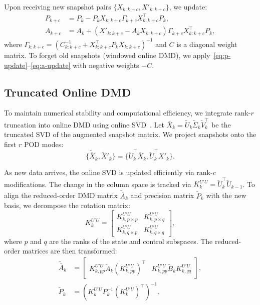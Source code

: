 \documentclass[conference]{IEEEtran}
\begin{document}
Upon receiving new snapshot pairs \(\{X_{k:k+c}, X'_{k:k+c}\}\), we update:
\begin{align}
    P_{k+c} & = P_k - P_k X_{k:k+c} \Gamma_{k+c} X_{k:k+c}^\top P_k, \label{eq:p-update}                \\
    A_{k+c} & = A_k + (X'_{k:k+c} - A_k X_{k:k+c}) \Gamma_{k+c} X_{k:k+c}^\top P_k, \label{eq:a-update}
\end{align}
where \(\Gamma_{k:k+c} = (C_{k:k+c}^{-1} + X_{k:k+c}^\top P_k X_{k:k+c})^{-1}\) and \(C\) is a diagonal weight matrix. To forget old snapshots (windowed online DMD), we apply~\eqref{eq:p-update}--\eqref{eq:a-update} with negative weights \(-C\).

\subsection{Truncated Online DMD}

To maintain numerical stability and computational efficiency, we integrate rank-\(r\) truncation into online DMD using online SVD~\cite{Brand2006, Zhang2022}. Let \(\bar{X}_k = \tilde{U}_k \tilde{\Sigma}_k \tilde{V}_k^\top\) be the truncated SVD of the augmented snapshot matrix. We project snapshots onto the first \(r\) POD modes:
\begin{equation}
    \{\tilde{\bar{X}}_k, \tilde{X}'_k\} = \{\tilde{U}_k^\top \bar{X}_k, \tilde{U}_k^\top X'_k\}.
\end{equation}

As new data arrives, the online SVD is updated efficiently via rank-\(c\) modifications. The change in the column space is tracked via \(K^{U'U}_k = \tilde{U}_k^\top \tilde{U}_{k-1}\). To align the reduced-order DMD matrix \(\tilde{\bar{A}}_k\) and precision matrix \(\tilde{P}_k\) with the new basis, we decompose the rotation matrix:
\begin{equation}
    K^{U'U}_k = \begin{bmatrix}
        K^{U'U}_{k, p \times p} & K^{U'U}_{k, p \times q} \\
        K^{U'U}_{k, q \times p} & K^{U'U}_{k, q \times q}
    \end{bmatrix},
\end{equation}
where \(p\) and \(q\) are the ranks of the state and control subspaces. The reduced-order matrices are then transformed:
\begin{align}
    \tilde{\bar{A}}_k & = \begin{bmatrix} K^{U'U}_{k,pp} \tilde{A}_k (K^{U'U}_{k,pp})^\top & K^{U'U}_{k,pp} \tilde{B}_k K^{U'U}_{k,qq} \end{bmatrix}, \\
    \tilde{P}_k       & = {(K^{U'U}_k P_k^{-1} (K^{U'U}_k)^\top)}^{-1}.
\end{align}
\end{document}
